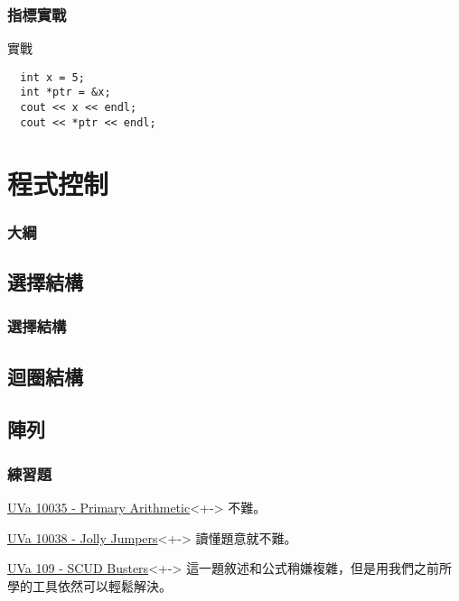 \documentclass[utf8]{beamer}
\begin{document}
\begin{CJK}{UTF8}{bkai}
\begin{frame}[fragile]
  \frametitle{指標實戰}
  \begin{block}{實戰}
    \begin{lstlisting}
  int x = 5;
  int *ptr = &x;
  cout << x << endl;
  cout << *ptr << endl;
    \end{lstlisting}
  \end{block}
\end{frame}

\section{程式控制}
\begin{frame}
  \frametitle{大綱}
  \begin{multicols}{2}
    \tableofcontents[currentsection]
  \end{multicols}
\end{frame}

\subsection{選擇結構}

\begin{frame}
  \frametitle{選擇結構}
\end{frame}

\subsection{迴圈結構}
\subsection{陣列}

\begin{frame}
  \frametitle{練習題}
  \begin{exampleblock}{\href{http://unfortunate-dog.github.io/articles/100/p10035/}{UVa 10035 - Primary Arithmetic}}<+->
  \label{uva:10035}
  不難。
  \end{exampleblock}
  \begin{exampleblock}{\href{http://unfortunate-dog.github.io/articles/100/p10038/}{UVa 10038 - Jolly Jumpers}}<+->
  \label{uva:10038}
  讀懂題意就不難。
  \end{exampleblock}
  \begin{exampleblock}{\href{http://unfortunate-dog.github.io/articles/1/p109/}{UVa 109 - SCUD Busters}}<+->
  \label{uva:591}
  這一題敘述和公式稍嫌複雜，但是用我們之前所學的工具依然可以輕鬆解決。
  \end{exampleblock}
\end{frame}


\end{CJK}
\end{document}
